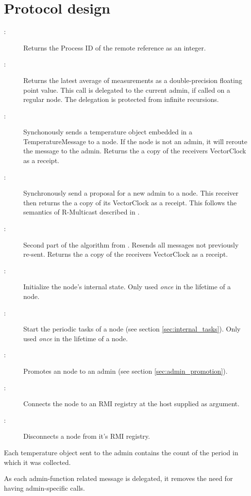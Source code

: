 \documentclass[10pt,a4paper]{article}
\begin{document}
\section{Protocol design}
\label{sec:protocol_design}
\begin{description}
  \item[:] Returns the Process ID of the remote reference as an integer.
  \item[:] Returns the latest average of measurements as a double-precision floating point value. This call is delegated to the current admin, if called on a regular node. The delegation is protected from infinite recursions.
  \item[:] Synchonously sends a temperature object embedded in a TemperatureMessage to a node. If the node is not an admin, it will reroute the message to the admin. Returns the a copy of the receivers VectorClock as a receipt.
  \item[:] Synchronously send a proposal for a new admin to a node. This receiver then returns the a copy of its VectorClock as a receipt. This follows the semantics of R-Multicast described in \cite{DistSystems}.
  \item[:] Second part of the algorithm from . Resends all messages not previously re-sent. Returns the a copy of the receivers VectorClock as a receipt.
  \item[:] Initialize the node's internal state. Only used \emph{once} in the lifetime of a node.
  \item[:] Start the periodic tasks of a node (see section \ref{sec:internal_tasks}). Only used \emph{once} in the lifetime of a node.
  \item[:] Promotes an node to an admin (see section \ref{sec:admin_promotion}).
  \item[:] Connects the node to an RMI registry at the host supplied as argument.
  \item[:] Disconnects a node from it's RMI registry.
\end{description} 

Each temperature object sent to the admin contains the count of the period in which it was collected.

As each admin-function related message is delegated, it removes the need for having admin-specific calls.
\end{document}
